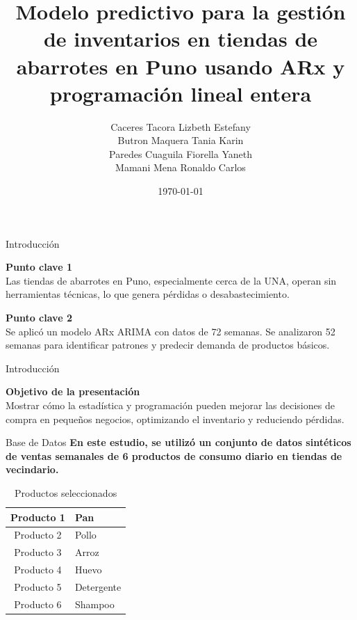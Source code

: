\documentclass{beamer}
\title{Modelo predictivo para la gestión de inventarios en tiendas de abarrotes en Puno usando ARx y programación lineal entera}
\author{
Caceres Tacora Lizbeth Estefany\\
Butron Maquera Tania Karin\\
Paredes Cuaguila Fiorella Yaneth\\
Mamani Mena Ronaldo Carlos\\
}
\institute{Métodos de Optimización}
\date{\today}
\begin{document}
\begin{frame}
    \titlepage
\end{frame}

\begin{frame}{Introducción}
    \vspace{-0.2cm} %

    \textbf{Punto clave 1}\\
    Las tiendas de abarrotes en Puno, especialmente cerca de la UNA, operan sin herramientas técnicas, lo que genera pérdidas o desabastecimiento.

    \vspace{0.4cm}
    \textbf{Punto clave 2}\\
    Se aplicó un modelo ARx ARIMA con datos de 72 semanas. Se analizaron 52 semanas para identificar patrones y predecir demanda de productos básicos.
\end{frame}

\begin{frame}{Introducción}
    \vspace{-0.2cm} %

    \textbf{Objetivo de la presentación}\\
    Mostrar cómo la estadística y programación pueden mejorar las decisiones de compra en pequeños negocios, optimizando el inventario y reduciendo pérdidas.
\end{frame}
\begin{frame}{Base de Datos}
  \vspace{0.3cm}
  \textbf{En este estudio, se utilizó un conjunto de datos sintéticos de ventas semanales de 6 productos de consumo diario en tiendas de vecindario.}
  \vspace{0.5cm}
  \begin{table}[]
    \centering
    \caption{Productos seleccionados}
    \renewcommand{\arraystretch}{1.3}
    \begin{tabular}{|c|l|}
    \hline
    Producto 1 & Pan \\ \hline
    Producto 2 & Pollo \\ \hline
    Producto 3 & Arroz \\ \hline
    Producto 4 & Huevo \\ \hline
    Producto 5 & Detergente \\ \hline
    Producto 6 & Shampoo \\ \hline
    \end{tabular}
  \end{table}
\end{frame}
\end{document}
